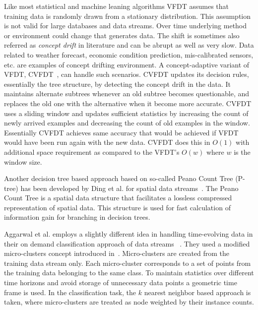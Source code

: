 Like most statistical and machine leaning algorithms VFDT assumes that training data is randomly drawn from a stationary distribution. This assumption is not valid for large databases and data streams. Over time underlying method or environment could change that generates data. The shift is sometimes also referred as {\it concept drift} in literature and can be abrupt as well as very slow. Data related to weather forecast, economic condition prediction, mis-calibrated sensors, etc. are examples of concept drifting environment. A concept-adaptive variant of VFDT, CVFDT~\cite{hulten01:cvfdt}, can handle such scenarios. CVFDT updates its decision rules, essentially the tree structure, by detecting the concept drift in the data. It maintains alternate subtrees whenever an old subtree becomes questionable, and replaces the old one with the alternative when it become more accurate. CVFDT uses a sliding window and updates sufficient statistics by increasing the count of newly arrived examples and decreasing the count of old examples in the window. Essentially CVFDT achieves same accuracy that would be achieved if VFDT would have been run again with the new data. CVFDT does this in $O(1)$ with additional space requirement as compared to the VFDT's $O(w)$ where $w$ is the window size.

Another decision tree based approach based on so-called Peano Count Tree (P-tree) has been developed by Ding et al. for spatial data streams~\cite{ding02:peanocount}. The Peano Count Tree is a spatial data structure that facilitates a lossless compressed representation of spatial data. This structure is used for fast calculation of information gain for branching in decision trees.

Aggarwal et al. employs a slightly different idea in handling time-evolving data in their on demand classification approach of data streams ~\cite{aggarwal04:ondemand}. They used a modified micro-clusters concept introduced in~\cite{aggarwal03:clustream}. Micro-clusters are created from the training data stream only. Each micro-cluster corresponds to a set of points from the training data belonging to the same class. To maintain statistics over different time horizons and avoid storage of unnecessary data points a geometric time frame is used. In the classification task, the $k$ nearest neighbor based approach is taken, where micro-clusters are treated as node weighted by their instance counts. 

